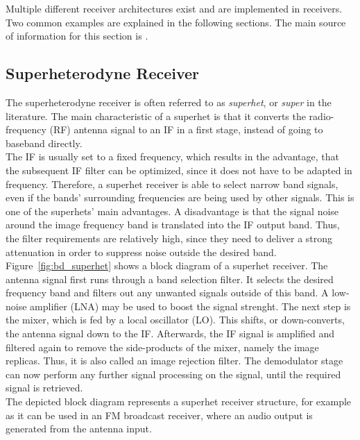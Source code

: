 Multiple different receiver architectures exist and are implemented in receivers.
Two common examples are explained in the following sections.
The main source of information for this section is \cite{PassosFábio2020AHSo}.

\subsection{Superheterodyne Receiver}

The superheterodyne receiver is often referred to as \textit{superhet}, or \textit{super} in the literature.
The main characteristic of a superhet is that it converts the radio-frequency (RF) antenna signal to an IF in a first stage, instead of going to baseband directly.\\

The IF is usually set to a fixed frequency, which results in the advantage, that the subsequent IF filter can be optimized, since it does not have to be adapted in frequency.
Therefore, a superhet receiver is able to select narrow band signals, even if the bands' surrounding frequencies are being used by other signals.
This is one of the superhets' main advantages.
A disadvantage is that the signal noise around the image frequency band is translated into the IF output band.
Thus, the filter requirements are relatively high, since they need to deliver a strong attenuation in order to suppress noise outside the desired band.\\

Figure~\ref{fig:bd_superhet} shows a block diagram of a superhet receiver.
The antenna signal first runs through a band selection filter.
It selects the desired frequency band and filters out any unwanted signals outside of this band.
A low-noise amplifier (LNA) may be used to boost the signal strenght.
The next step is the mixer, which is fed by a local oscillator (LO).
This shifts, or down-converts, the antenna signal down to the IF.
Afterwards, the IF signal is amplified and filtered again to remove the side-products of the mixer, namely the image replicas.
Thus, it is also called an image rejection filter.
The demodulator stage can now perform any further signal processing on the signal, until the required signal is retrieved.\\

The depicted block diagram represents a superhet receiver structure, for example as it can be used in an FM broadcast receiver, where an audio output is generated from the antenna input.

